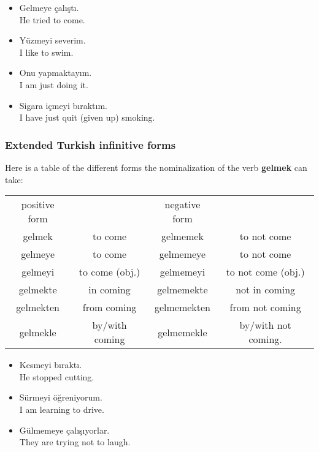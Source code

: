 \begin{itemize}
\item Gelmeye çalıştı.\\
  He tried to come.
\item Yüzmeyi severim.\\
  I like to swim.
\item Onu yapmaktayım.\\
  I am just doing it.
\item Sigara içmeyi bıraktım.\\
  I have just quit (given up) smoking.
\end{itemize}

\subsubsection{Extended Turkish infinitive forms}
Here is a table of the different forms the nominalization of the verb
\textbf{gelmek} can take:
\begin{tabular}{cccc}
  positive form&&negative form\\
  gelmek&to come&gelmemek&to not come\\
  gelmeye&to come&gelmemeye&to not come\\
  gelmeyi&to come (obj.)&gelmemeyi&to not come (obj.)\\
  gelmekte&in coming&gelmemekte&not in coming\\
  gelmekten&from coming&gelmemekten&from not coming\\
  gelmekle&by/with coming&gelmemekle&by/with not coming.
\end{tabular}

\begin{itemize}
\item Kesmeyi bıraktı.\\
  He stopped cutting.
\item Sürmeyi öğreniyorum.\\
  I am learning to drive.
\item Gülmemeye çalışıyorlar.\\
  They are trying not  to laugh.
\end{itemize}

